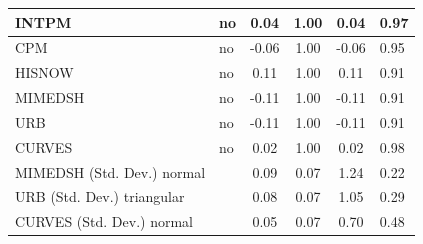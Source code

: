 \begin{table}
\begin{center}
\begin{tabular}{|l|l|c|c|c|l|}
			INTPM & no & 0.04 & 1.00 & 0.04 & 0.97 \\
			\hline
			CPM & no & -0.06 & 1.00 & -0.06 & 0.95 \\
			\hline
			HISNOW & no & 0.11 & 1.00 & 0.11 & 0.91 \\
			\hline
			MIMEDSH & no & -0.11 & 1.00 & -0.11 & 0.91 \\
			\hline
			URB & no & -0.11 & 1.00 & -0.11 & 0.91 \\
			\hline
			CURVES & no & 0.02 & 1.00 & 0.02 & 0.98 \\
			\hline
			MIMEDSH (Std. Dev.) normal &  & 0.09 & 0.07 & 1.24 & 0.22 \\
			\hline
			URB (Std. Dev.) triangular &  & 0.08 & 0.07 & 1.05 & 0.29 \\
			\hline
			CURVES (Std. Dev.) normal &  & 0.05 & 0.07 & 0.70 & 0.48 \\
			\hline
		\end{tabular}
	\end{center}
\end{table}